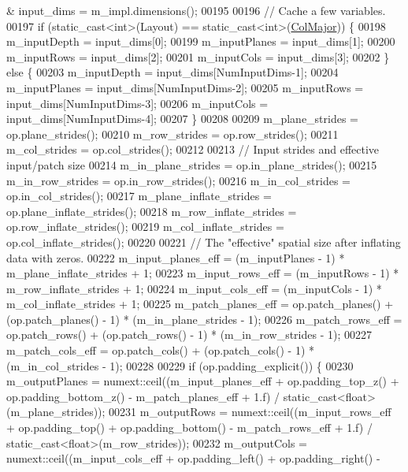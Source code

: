 \begin{DoxyCode}
      & input\_dims = m\_impl.dimensions();
00195 
00196     \textcolor{comment}{// Cache a few variables.}
00197     \textcolor{keywordflow}{if} (static\_cast<int>(Layout) == static\_cast<int>(\hyperlink{group__enums_ggaacded1a18ae58b0f554751f6cdf9eb13a0cbd4bdd0abcfc0224c5fcb5e4f6669a}{ColMajor})) \{
00198       m\_inputDepth = input\_dims[0];
00199       m\_inputPlanes = input\_dims[1];
00200       m\_inputRows = input\_dims[2];
00201       m\_inputCols = input\_dims[3];
00202     \} \textcolor{keywordflow}{else} \{
00203       m\_inputDepth = input\_dims[NumInputDims-1];
00204       m\_inputPlanes = input\_dims[NumInputDims-2];
00205       m\_inputRows = input\_dims[NumInputDims-3];
00206       m\_inputCols = input\_dims[NumInputDims-4];
00207     \}
00208 
00209     m\_plane\_strides = op.plane\_strides();
00210     m\_row\_strides = op.row\_strides();
00211     m\_col\_strides = op.col\_strides();
00212 
00213     \textcolor{comment}{// Input strides and effective input/patch size}
00214     m\_in\_plane\_strides = op.in\_plane\_strides();
00215     m\_in\_row\_strides = op.in\_row\_strides();
00216     m\_in\_col\_strides = op.in\_col\_strides();
00217     m\_plane\_inflate\_strides = op.plane\_inflate\_strides();
00218     m\_row\_inflate\_strides = op.row\_inflate\_strides();
00219     m\_col\_inflate\_strides = op.col\_inflate\_strides();
00220 
00221     \textcolor{comment}{// The "effective" spatial size after inflating data with zeros.}
00222     m\_input\_planes\_eff = (m\_inputPlanes - 1) * m\_plane\_inflate\_strides + 1;
00223     m\_input\_rows\_eff = (m\_inputRows - 1) * m\_row\_inflate\_strides + 1;
00224     m\_input\_cols\_eff = (m\_inputCols - 1) * m\_col\_inflate\_strides + 1;
00225     m\_patch\_planes\_eff = op.patch\_planes() + (op.patch\_planes() - 1) * (m\_in\_plane\_strides - 1);
00226     m\_patch\_rows\_eff = op.patch\_rows() + (op.patch\_rows() - 1) * (m\_in\_row\_strides - 1);
00227     m\_patch\_cols\_eff = op.patch\_cols() + (op.patch\_cols() - 1) * (m\_in\_col\_strides - 1);
00228 
00229     \textcolor{keywordflow}{if} (op.padding\_explicit()) \{
00230       m\_outputPlanes = numext::ceil((m\_input\_planes\_eff + op.padding\_top\_z() + op.padding\_bottom\_z() - 
      m\_patch\_planes\_eff + 1.f) / static\_cast<float>(m\_plane\_strides));
00231       m\_outputRows = numext::ceil((m\_input\_rows\_eff + op.padding\_top() + op.padding\_bottom() - 
      m\_patch\_rows\_eff + 1.f) / static\_cast<float>(m\_row\_strides));
00232       m\_outputCols = numext::ceil((m\_input\_cols\_eff + op.padding\_left() + op.padding\_right() - 

\end{DoxyCode}
